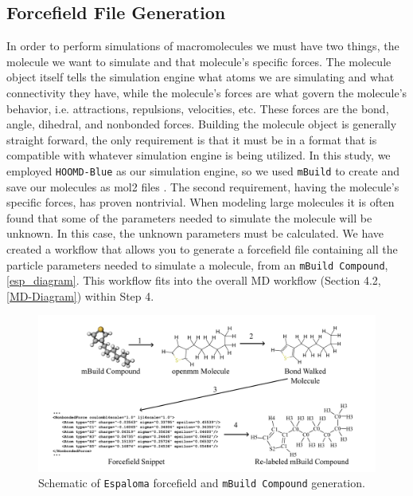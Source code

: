 \subsection{Forcefield File Generation}
In order to perform simulations of macromolecules we must have two things, the molecule we want to simulate and that molecule's specific forces. The molecule object itself tells the simulation engine what atoms we are simulating and what connectivity they have, while the molecule's forces are what govern the molecule's behavior, i.e. attractions, repulsions, velocities, etc. These forces are the bond, angle, dihedral, and nonbonded forces. Building the molecule object is generally straight forward, the only requirement is that it must be in a format that is compatible with whatever simulation engine is being utilized. In this study, we employed \texttt{HOOMD-Blue} as our simulation engine, so we used \texttt{mBuild} to create and save our molecules as mol2 files \citep{anderson_hoomd-blue_2020,cummings_opensource_2021, Klein_mbuild}. The second requirement, having the molecule's specific forces, has proven nontrivial. When modeling large molecules it is often found that some of the parameters needed to simulate the molecule will be unknown. In this case, the unknown parameters must be calculated. We have created a workflow that allows you to generate a forcefield file containing all the particle parameters needed to simulate a molecule, from an \texttt{mBuild Compound}, \autoref{esp_diagram}. This workflow fits into the overall MD workflow (Section 4.2, \autoref{MD-Diagram}) within Step 4. 
\begin{figure}
    \centering
    \includegraphics[width=1\linewidth]{src/figures/FF_figs/esp_fig.png}
    \caption{Schematic of \texttt{Espaloma} forcefield and \texttt{mBuild Compound} generation.}
    \label{esp_diagram}
\end{figure}
